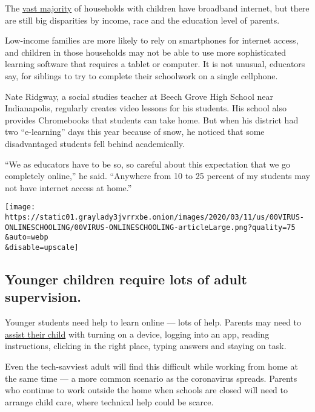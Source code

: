 The
\href{https://www.census.gov/content/dam/Census/library/publications/2018/acs/ACS-39.pdf}{vast
majority} of households with children have broadband internet, but there
are still big disparities by income, race and the education level of
parents.

Low-income families are more likely to rely on smartphones for internet
access, and children in those households may not be able to use more
sophisticated learning software that requires a tablet or computer. It
is not unusual, educators say, for siblings to try to complete their
schoolwork on a single cellphone.

Nate Ridgway, a social studies teacher at Beech Grove High School near
Indianapolis, regularly creates video lessons for his students. His
school also provides Chromebooks that students can take home. But when
his district had two ``e-learning'' days this year because of snow, he
noticed that some disadvantaged students fell behind academically.

``We as educators have to be so, so careful about this expectation that
we go completely online,'' he said. ``Anywhere from 10 to 25 percent of
my students may not have internet access at home.''

\texttt{[image: https://static01.graylady3jvrrxbe.onion/images/2020/03/11/us/00VIRUS-ONLINESCHOOLING/00VIRUS-ONLINESCHOOLING-articleLarge.png?quality=75\\\&auto=webp\\\&disable=upscale]}

\hypertarget{younger-children-require-lots-of-adult-supervision}{%
\subsection{Younger children require lots of adult
supervision.}\label{younger-children-require-lots-of-adult-supervision}}

Younger students need help to learn online --- lots of help. Parents may
need to
\href{https://www.nytimes3xbfgragh.onion/interactive/2020/03/10/us/covid-19-seattle-washington-home-schooling-remote.html}{assist
their child} with turning on a device, logging into an app, reading
instructions, clicking in the right place, typing answers and staying on
task.

Even the tech-savviest adult will find this difficult while working from
home at the same time --- a more common scenario as the coronavirus
spreads. Parents who continue to work outside the home when schools are
closed will need to arrange child care, where technical help could be
scarce.

